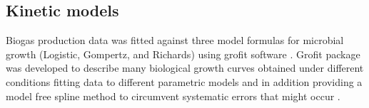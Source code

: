 \subsection{Kinetic models}
Biogas production data was fitted against three model formulas for microbial growth (Logistic, Gompertz, and Richards) using grofit software \cite{Kahm_2010}. Grofit package was developed to describe many biological growth curves obtained under different conditions fitting data to different parametric models and in addition providing a model free spline method to circumvent systematic errors that might
occur \cite{Kahm_2010}.